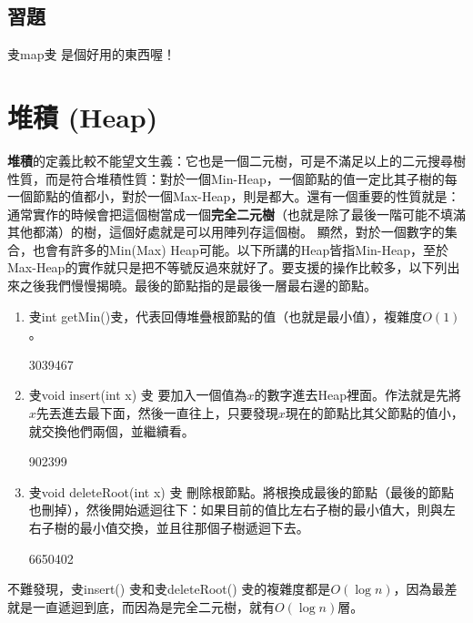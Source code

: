 \documentclass[main.tex]{subfiles}
\begin{document}
\subsection{習題}
叏map叏 是個好用的東西喔！
\section{堆積 (Heap)}
\textbf{堆積}的定義比較不能望文生義：它也是一個二元樹，可是不滿足以上的二元搜尋樹性質，而是符合堆積性質：對於一個Min-Heap，一個節點的值一定比其子樹的每一個節點的值都小，對於一個Max-Heap，則是都大。還有一個重要的性質就是：通常實作的時候會把這個樹當成一個\textbf{完全二元樹}（也就是除了最後一階可能不填滿其他都滿）的樹，這個好處就是可以用陣列存這個樹。
顯然，對於一個數字的集合，也會有許多的Min(Max) Heap可能。以下所講的Heap皆指Min-Heap，至於Max-Heap的實作就只是把不等號反過來就好了。要支援的操作比較多，以下列出來之後我們慢慢揭曉。最後的節點指的是最後一層最右邊的節點。
\begin{enumerate}
\item 叏int getMin()叏，代表回傳堆疊根節點的值（也就是最小值），複雜度$O(1)$。
\begin{C++}3039467\end{C++}
\item 叏void insert(int x) 叏 要加入一個值為$x$的數字進去Heap裡面。作法就是先將$x$先丟進去最下面，然後一直往上，只要發現$x$現在的節點比其父節點的值小，就交換他們兩個，並繼續看。
\begin{C++}902399\end{C++}
\item 叏void deleteRoot(int x) 叏 刪除根節點。將根換成最後的節點（最後的節點也刪掉），然後開始遞迴往下：如果目前的值比左右子樹的最小值大，則與左右子樹的最小值交換，並且往那個子樹遞迴下去。
\begin{C++}6650402\end{C++}
\end{enumerate}
不難發現，叏insert() 叏和叏deleteRoot() 叏的複雜度都是$O(\log n)$，因為最差就是一直遞迴到底，而因為是完全二元樹，就有$O(\log n)$層。
\end{document}
